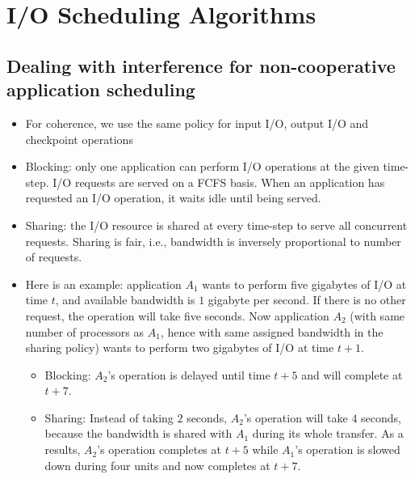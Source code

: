 \section{I/O Scheduling Algorithms}\label{sec:algorithms}

  \subsection{Dealing with interference for non-cooperative application scheduling}
  \begin{itemize}
    \item For coherence, we use the same policy for input I/O, output I/O and checkpoint operations 
    \item Blocking: only one application can perform I/O operations at the given time-step.
    I/O requests are served on a FCFS basis. When an application has requested an I/O
    operation, it waits idle until being served. 
    \item Sharing: the I/O resource is shared at every time-step to serve all concurrent requests. Sharing is fair, i.e., bandwidth is inversely proportional to number of requests.
    \item Here is an example:
    application $A_{1}$ wants to perform five gigabytes of I/O at time $t$,
    and available bandwidth is
    $1$ gigabyte per second. If there is no other request, the operation will take five seconds.
    Now application $A_{2}$ (with same number of processors as $A_{1}$, hence with same assigned bandwidth in the sharing policy) wants to perform two gigabytes of I/O at time $t+1$.
    \begin{itemize}
    \item Blocking: $A_{2}$'s operation is delayed until time $t+5$ and will complete at $t+7$.
    \item Sharing: Instead of taking $2$ seconds, $A_{2}$'s operation will take $4$ seconds, because the bandwidth is shared with $A_{1}$ during its whole transfer. As a results, $A_{2}$'s operation completes at $t+5$ while $A_{1}$'s  operation is slowed down during four units and now completes at $t+7$.
    \end{itemize}
  \end{itemize}

